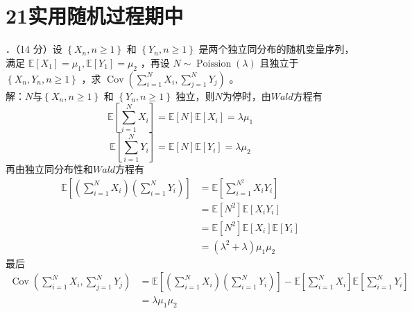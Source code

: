 \documentclass[UTF8,openany]{book}
\begin{document}
\section{\centering 21实用随机过程期中}
．（14 分）设 $\left\{X_{n}, n \geq 1\right\}$ 和 $\left\{Y_{n}, n \geq 1\right\}$ 是两个独立同分布的随机变量序列，满足 $\mathbb{E} [X_{1}]=\mu_{1}, \mathbb{E} [Y_{1}]=\mu_{2}$ ，再设 $N \sim \operatorname{Poission}(\lambda)$ 且独立于 $\left\{X_{n}, Y_{n}, n \geq 1\right\}$ ，求 $\operatorname{Cov}\left(\sum\limits_{i=1}^N X_{i}, \sum\limits_{j=1}^N Y_{j}\right)$ 。\\
解：$N$与$\left\{X_{n}, n \geq 1\right\}$ 和 $\left\{Y_{n}, n \geq 1\right\}$ 独立，则$N$为停时，由$Wald$方程有
\[
\mathbb{E}\left[\sum\limits_{i=1}^N X_{i} \right]=\mathbb{E}[N]\mathbb{E}[X_i]=\lambda \mu_1 
\]
\[
\mathbb{E}\left[\sum\limits_{i=1}^N Y_{i} \right]=\mathbb{E}[N]\mathbb{E}[Y_i]=\lambda \mu_2
\]
再由独立同分布性和$Wald$方程有
\begin{align*}
	\mathbb{E}\left[\left(\sum_{i=1}^N X_i \right) \left(\sum_{i=1}^N Y_i  \right)   \right]  & =\mathbb{E}\left[\sum\limits_{i=1}^{N^2} X_iY_i \right] \\
	& =\mathbb{E}[N^2]\mathbb{E}[X_iY_i]\\
	&=\mathbb{E}[N^2]\mathbb{E}[X_i]\mathbb{E}[Y_i]\\
	&=(\lambda^2+\lambda)\mu_1 \mu_2
\end{align*}
最后
\begin{align*}
	\operatorname{Cov}\left(\sum\limits_{i=1}^N X_{i}, \sum\limits_{j=1}^N Y_{j}\right) & =\mathbb{E}\left[\left(\sum_{i=1}^N X_i \right) \left(\sum_{i=1}^N Y_i  \right)   \right]-\mathbb{E}\left[\sum\limits_{i=1}^N X_{i} \right]\mathbb{E}\left[\sum\limits_{i=1}^N Y_{i} \right] \\
	& =\lambda \mu_1 \mu_2
\end{align*}\\
\end{document}
